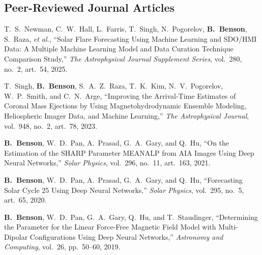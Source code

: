\documentclass[11pt,letterpaper]{article}
\newcommand{\me}{\textbf{B.~Benson}}
\begin{document}
\subsection{Peer-Reviewed Journal Articles}
\begin{pubs}
  \item T.~S.~Newman, C.~W.~Hall, L.~Farris, T.~Singh, N.~Pogorelov, \me, S.~Raza, \textit{et al.}, ``Solar Flare Forecasting Using Machine Learning and SDO/HMI Data: A Multiple Machine Learning Model and Data Curation Technique Comparison Study,'' \textit{The Astrophysical Journal Supplement Series}, vol.~280, no.~2, art.~54, 2025.
  \item T.~Singh, \me, S.~A.~Z.~Raza, T.~K.~Kim, N.~V.~Pogorelov, W.~P.~Smith, and C.~N.~Arge, ``Improving the Arrival-Time Estimates of Coronal Mass Ejections by Using Magnetohydrodynamic Ensemble Modeling, Heliospheric Imager Data, and Machine Learning,'' \textit{The Astrophysical Journal}, vol.~948, no.~2, art.~78, 2023.
  \item \me, W.~D.~Pan, A.~Prasad, G.~A.~Gary, and Q.~Hu, ``On the Estimation of the SHARP Parameter MEANALP from AIA Images Using Deep Neural Networks,'' \textit{Solar Physics}, vol.~296, no.~11, art.~163, 2021.
  \item \me, W.~D.~Pan, A.~Prasad, G.~A.~Gary, and Q.~Hu, ``Forecasting Solar Cycle 25 Using Deep Neural Networks,'' \textit{Solar Physics}, vol.~295, no.~5, art.~65, 2020.
  \item \me, W.~D.~Pan, G.~A.~Gary, Q.~Hu, and T.~Staudinger, ``Determining the Parameter for the Linear Force-Free Magnetic Field Model with Multi-Dipolar Configurations Using Deep Neural Networks,'' \textit{Astronomy and Computing}, vol.~26, pp.~50--60, 2019.
\end{pubs}
\end{document}
